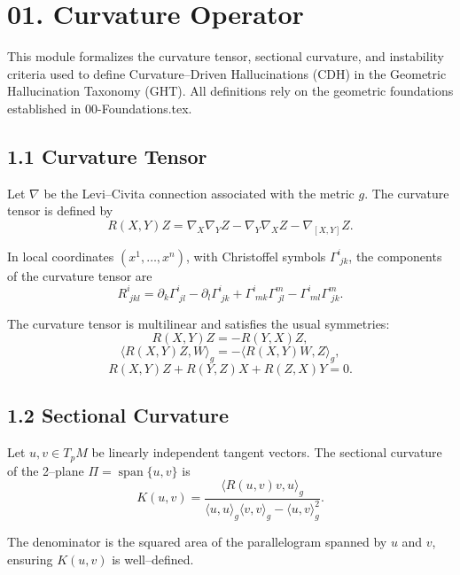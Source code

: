 
\section*{01. Curvature Operator}

This module formalizes the curvature tensor, sectional curvature, and
instability criteria used to define Curvature–Driven Hallucinations (CDH)
in the Geometric Hallucination Taxonomy (GHT). All definitions rely on
the geometric foundations established in 00-Foundations.tex.

\subsection*{1.1 Curvature Tensor}

Let $\nabla$ be the Levi–Civita connection associated with the metric $g$.
The curvature tensor is defined by
\[
R(X,Y)Z
= \nabla_X \nabla_Y Z
- \nabla_Y \nabla_X Z
- \nabla_{[X,Y]} Z.
\]

In local coordinates $(x^1,\dots,x^n)$, with Christoffel symbols
$\Gamma^i_{\;jk}$, the components of the curvature tensor are
\[
R^i_{\;jkl}
= \partial_k \Gamma^i_{\;jl}
- \partial_l \Gamma^i_{\;jk}
+ \Gamma^i_{\;mk} \Gamma^m_{\;jl}
- \Gamma^i_{\;ml} \Gamma^m_{\;jk}.
\]

The curvature tensor is multilinear and satisfies the usual symmetries:
\[
R(X,Y)Z = -R(Y,X)Z,
\]
\[
\langle R(X,Y)Z, W \rangle_g
= -\langle R(X,Y)W, Z \rangle_g,
\]
\[
R(X,Y)Z + R(Y,Z)X + R(Z,X)Y = 0.
\]

\subsection*{1.2 Sectional Curvature}

Let $u,v \in T_p M$ be linearly independent tangent vectors. The sectional
curvature of the 2–plane $\Pi = \operatorname{span}\{u,v\}$ is
\[
K(u,v)
= \frac{\langle R(u,v)v, u \rangle_g}
       {\langle u,u \rangle_g \langle v,v \rangle_g
        - \langle u,v \rangle_g^2}.
\]

The denominator is the squared area of the parallelogram spanned by
$u$ and $v$, ensuring $K(u,v)$ is well–defined.

